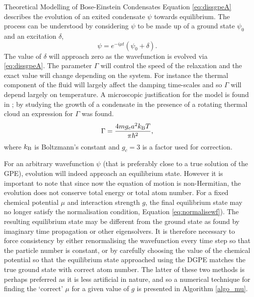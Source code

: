 \begin{chapter}{\label{cha:theoretical_model}Theoretical Modelling of Bose-Einstein Condensates}
	Equation \ref{eq:dissgpeA} describes the evolution of an exited condensate $\psi$ towards equilibrium. The process can be understood by considering $\psi$ to be made up of a ground state $\psi_0$ and an excitation $\delta$,
	\begin{equation*}\label{eq:dissantiherm2}
		\psi = e^{-i \mu t}(\psi_0 + \delta).
	\end{equation*}
	The value of $\delta$ will approach zero as the wavefunction is evolved via \ref{eq:dissgpeA}. The parameter $\Gamma$ will control the speed of the relaxation and the exact value will change depending on the system. For instance the thermal component of the fluid will largely affect the damping time-scales and so $\Gamma$ will depend largely on temperature. A microscopic justification for the model is found in \cite{penckwitt_2002, gardiner97}; by studying the growth of a condensate in the presence of a rotating thermal cloud an expression for $\Gamma$ was found.
		\begin{equation}\label{eq:dissgamma}
		\Gamma = \frac{4mg_ca^2k_{\rm B}T}{\pi\hbar^2},
		\end{equation}
	where $k_{\rm B}$ is Boltzmann's constant and $g_c = 3$ is a factor used for correction.

	For an arbitrary wavefunction $\psi$ (that is preferably close to a true solution of the GPE), evolution will indeed approach an equilibrium state. However it is important to note that since now the equation of motion is non-Hermitian, the evolution does not conserve total energy or total atom number. For a fixed chemical potential $\mu$ and interaction strength $g$, the final equilibrium state may no longer satisfy the normalisation condition, Equation \ref{eq:normalisewf}). The resulting equilibrium state may be different from the ground state as found by imaginary time propagation or other eigensolvers. It is therefore necessary to force consistency by either renormalising the wavefunction every time step so that the particle number is constant, or by carefully choosing the value of the chemical potential so that the equilibrium state approached using the DGPE matches the true ground state with correct atom number. The latter of these two methods is perhaps preferred as it is less artificial in nature, and so a numerical technique for finding the `correct' $\mu$ for a given value of $g$ is presented in Algorithm \ref{algo_mu}.


\end{chapter}
